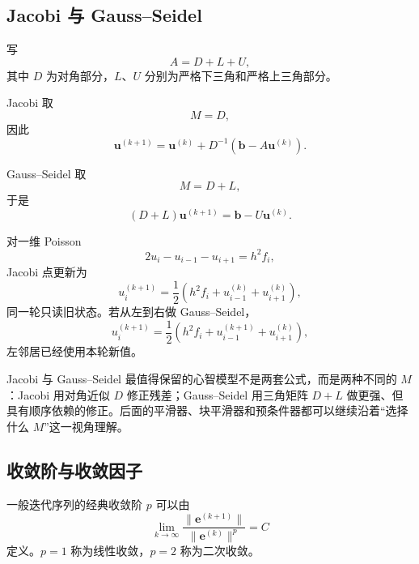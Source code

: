 \subsection{Jacobi 与 Gauss--Seidel}

写
\begin{equation}
A=D+L+U,
\end{equation}
其中 $D$ 为对角部分，$L$、$U$ 分别为严格下三角和严格上三角部分。

Jacobi 取
\begin{equation}
M=D,
\end{equation}
因此
\begin{equation}
\bm u^{(k+1)}
=
\bm u^{(k)}
+
D^{-1}
\left(\bm b-A\bm u^{(k)}\right).
\label{eq:linear-solvers-jacobi}
\end{equation}

Gauss--Seidel 取
\begin{equation}
M=D+L,
\end{equation}
于是
\begin{equation}
(D+L)\bm u^{(k+1)}
=
\bm b-U\bm u^{(k)}.
\label{eq:linear-solvers-gs}
\end{equation}

对一维 Poisson
\begin{equation}
2u_i-u_{i-1}-u_{i+1}=h^2f_i,
\end{equation}
Jacobi 点更新为
\begin{equation}
u_i^{(k+1)}
=
\frac12
\left(
h^2f_i+u_{i-1}^{(k)}+u_{i+1}^{(k)}
\right),
\end{equation}
同一轮只读旧状态。若从左到右做 Gauss--Seidel，
\begin{equation}
u_i^{(k+1)}
=
\frac12
\left(
h^2f_i+u_{i-1}^{(k+1)}+u_{i+1}^{(k)}
\right),
\end{equation}
左邻居已经使用本轮新值。

Jacobi 与 Gauss--Seidel 最值得保留的心智模型不是两套公式，而是两种不同的 $M$：Jacobi 用对角近似 $D$ 修正残差；Gauss--Seidel 用三角矩阵 $D+L$ 做更强、但具有顺序依赖的修正。后面的平滑器、块平滑器和预条件器都可以继续沿着“选择什么 $M$”这一视角理解。

\subsection{收敛阶与收敛因子}

一般迭代序列的经典收敛阶 $p$ 可以由
\begin{equation}
\lim_{k\to\infty}
\frac{\|\bm e^{(k+1)}\|}{\|\bm e^{(k)}\|^p}
=C
\label{eq:linear-solvers-convergence-order}
\end{equation}
定义。$p=1$ 称为线性收敛，$p=2$ 称为二次收敛。

